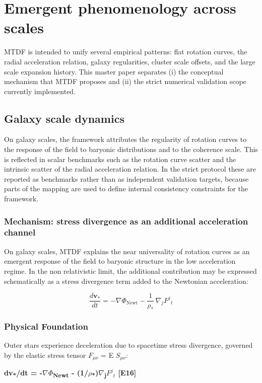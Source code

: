 \documentclass[11pt,a4paper]{article}
\begin{document}
\section{Emergent phenomenology across scales}
\label{sec:sec4}
MTDF is intended to unify several empirical patterns: flat rotation curves, the radial acceleration relation, galaxy regularities, cluster scale offsets, and the large scale expansion history. This master paper separates (i) the conceptual mechanism that MTDF proposes and (ii) the strict numerical validation scope currently implemented.

\subsection{Galaxy scale dynamics}
On galaxy scales, the framework attributes the regularity of rotation curves to the response of the field to baryonic distributions and to the coherence scale. This is reflected in scalar benchmarks such as the rotation curve scatter and the intrinsic scatter of the radial acceleration relation. In the strict protocol these are reported as benchmarks rather than as independent validation targets, because parts of the mapping are used to define internal consistency constraints for the framework.

\subsubsection{Mechanism: stress divergence as an additional acceleration channel}
On galaxy scales, MTDF explains the near universality of rotation curves as an emergent response of the field to baryonic structure in the low acceleration regime. In the non relativistic limit, the additional contribution may be expressed schematically as a stress divergence term added to the Newtonian acceleration:

\[
\frac{d\mathbf{v}_*}{dt} = -\nabla\Phi_\mathrm{Newt} - \frac{1}{\rho_*}\,\nabla_j F^j{}_t
\]

\subsubsection{Physical Foundation}
Outer stars experience deceleration due to spacetime stress divergence, governed by the elastic stress tensor $F_{\mu\nu}$ = E $S_{\mu\nu}$:

\textbf{dv\textsubscript{*}/dt = -$\nabla$$\Phi$\textsubscript{Newt} - (1/\allowbreak{}$\rho$\textsubscript{*})$\nabla$\textsubscript{j}$F^{j}{}_{t}$ [E16]}
\end{document}
